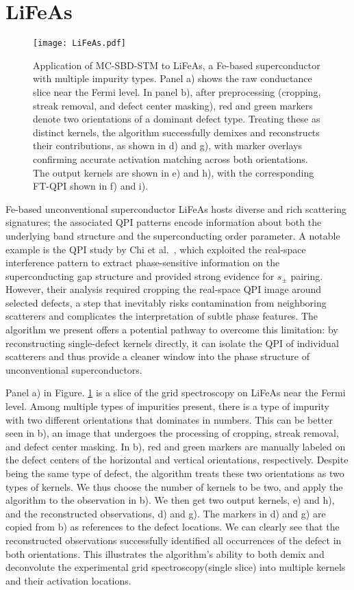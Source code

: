 \section{LiFeAs}

\begin{figure}
	\texttt{[image: LiFeAs.pdf]} 
	\centering
	\caption{Application of MC-SBD-STM to LiFeAs, a Fe-based superconductor with multiple impurity types. Panel a) shows the raw conductance slice near the Fermi level. In panel b), after preprocessing (cropping, streak removal, and defect center masking), red and green markers denote two orientations of a dominant defect type. Treating these as distinct kernels, the algorithm successfully demixes and reconstructs their contributions, as shown in d) and g), with marker overlays confirming accurate activation matching across both orientations. The output kernels are shown in e) and h), with the corresponding FT-QPI shown in f) and i).}
	\label{fig:LiFeAs}
\end{figure}
Fe-based unconventional superconductor LiFeAs hosts diverse and rich scattering signatures; the associated \ac{QPI} patterns encode information about both the underlying band structure and the superconducting order parameter. A notable example is the \ac{QPI} study by Chi et al.~\cite{chiSignInversionSuperconducting2014}, which exploited the real-space interference pattern to extract phase-sensitive information on the superconducting gap structure and provided strong evidence for $s_{\pm}$ pairing. However, their analysis required cropping the real-space QPI image around selected defects, a step that inevitably risks contamination from neighboring scatterers and complicates the interpretation of subtle phase features. The algorithm we present offers a potential pathway to overcome this limitation: by reconstructing single-defect kernels directly, it can isolate the QPI of individual scatterers and thus provide a cleaner window into the phase structure of unconventional superconductors.

Panel a) in Figure. \ref{fig:LiFeAs} is a slice of the grid spectroscopy on LiFeAs near the Fermi level. Among multiple types of impurities present, there is a type of impurity with two different orientations that dominates in numbers. This can be better seen in b), an image that undergoes the processing of cropping, streak removal, and defect center masking. In b), red and green markers are manually labeled on the defect centers of the horizontal and vertical orientations, respectively. Despite being the same type of defect, the algorithm treats these two orientations as two types of kernels. We thus choose the number of kernels to be two, and apply the algorithm to the observation in b). We then get two output kernels, e) and h), and the reconstructed observations, d) and g). The markers in d) and g) are copied from b) as references to the defect locations. We can clearly see that the reconstructed observations successfully identified all occurrences of the defect in both orientations. This illustrates the algorithm's ability to both demix and deconvolute the experimental grid spectroscopy(single slice) into multiple kernels and their activation locations. 


